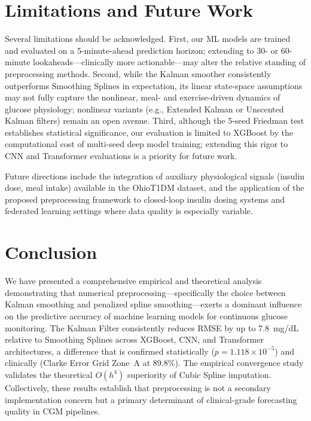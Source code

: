 \documentclass[pmlr,twocolumn,10pt]{jmlr} %
\begin{document}
\section{Limitations and Future Work}

Several limitations should be acknowledged. First, our ML models are trained and evaluated on a 5-minute-ahead prediction horizon; extending to 30- or 60-minute lookaheads---clinically more actionable---may alter the relative standing of preprocessing methods. Second, while the Kalman smoother consistently outperforms Smoothing Splines in expectation, its linear state-space assumptions may not fully capture the nonlinear, meal- and exercise-driven dynamics of glucose physiology; nonlinear variants (e.g., Extended Kalman or Unscented Kalman filters) remain an open avenue. Third, although the 5-seed Friedman test establishes statistical significance, our evaluation is limited to XGBoost by the computational cost of multi-seed deep model training; extending this rigor to CNN and Transformer evaluations is a priority for future work.

Future directions include the integration of auxiliary physiological signals (insulin dose, meal intake) available in the OhioT1DM dataset, and the application of the proposed preprocessing framework to closed-loop insulin dosing systems and federated learning settings where data quality is especially variable.

\section{Conclusion}

We have presented a comprehensive empirical and theoretical analysis demonstrating that numerical preprocessing---specifically the choice between Kalman smoothing and penalized spline smoothing---exerts a dominant influence on the predictive accuracy of machine learning models for continuous glucose monitoring. The Kalman Filter consistently reduces RMSE by up to 7.8~mg/dL relative to Smoothing Splines across XGBoost, CNN, and Transformer architectures, a difference that is confirmed statistically ($p = 1.118 \times 10^{-5}$) and clinically (Clarke Error Grid Zone~A at 89.8\%). The empirical convergence study validates the theoretical $O(h^4)$ superiority of Cubic Spline imputation. Collectively, these results establish that preprocessing is not a secondary implementation concern but a primary determinant of clinical-grade forecasting quality in CGM pipelines.


\end{document}
